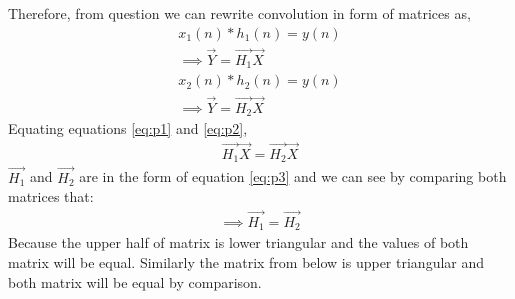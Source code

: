 \documentclass[journal,12pt,twocolumn]{IEEEtran}
\begin{document}
    Therefore, from question we can rewrite convolution in form of matrices as,
\begin{align}
    x_1(n) \ast h_1(n) = y(n)\\
    \implies \vec{Y}=\vec{H_1}\vec{X} \label{eq:p1}\\
    x_2(n) \ast h_2(n) = y(n)\\
    \implies \vec{Y}=\vec{H_2}\vec{X}\label{eq:p2}
\end{align}
Equating equations \eqref{eq:p1} and \eqref{eq:p2},
\begin{align}
\vec{H_1}\vec{X} = \vec{H_2}\vec{X}
\end{align}
$\vec{H_1}$ and $\vec{H_2}$ are in the form of equation \eqref{eq:p3} and we can see by comparing both matrices that:
\begin{align}
\implies \boxed{\vec{H_1} = \vec{H_2}}
\end{align}
Because the upper half of matrix is lower triangular and the values of both matrix will be equal. Similarly the matrix from below is upper triangular and both matrix will be equal by comparison.
\\
\end{document}
